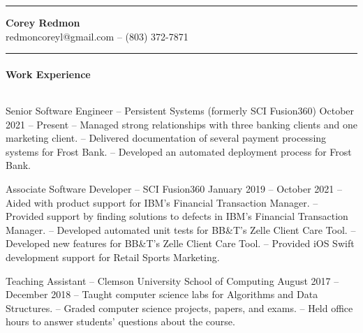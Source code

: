 \documentclass{article}
\begin{document}
  \hrule height 1pt
  \vspace{0.05in}
  \begin{center}
    {\Large \textbf{Corey Redmon}}\\
    redmoncoreyl@gmail.com -- (803) 372-7871
  \end{center}
  \vspace{0.1in}
  \hrule height 1pt

  \setlength{\parskip}{0.1in}
  \setlength{\parindent}{0.4in}

  \setlength{\parskip}{0.0in}
  \paragraph{Work Experience} $ $
  \setlength{\parskip}{0.1in}

  \hangindent=0.8in
  Senior Software Engineer -- Persistent Systems (formerly SCI Fusion360) \hfill October 2021 -- Present \newline
  -- Managed strong relationships with three banking clients and one marketing client. \newline
  -- Delivered documentation of several payment processing systems for Frost Bank. \newline
  -- Developed an automated deployment process for Frost Bank.

  \hangindent=0.8in
  Associate Software Developer -- SCI Fusion360 \hfill January 2019 -- October 2021 \newline
  -- Aided with product support for IBM's Financial Transaction Manager. \newline
  -- Provided support by finding solutions to defects in IBM's Financial Transaction Manager. \newline
  -- Developed automated unit tests for BB\&T's Zelle Client Care Tool. \newline
  -- Developed new features for BB\&T's Zelle Client Care Tool. \newline
  -- Provided iOS Swift development support for Retail Sports Marketing.

  \hangindent=0.8in
  Teaching Assistant -- Clemson University School of Computing \hfill August 2017 -- December 2018 \newline
  -- Taught computer science labs for Algorithms and Data Structures. \newline
  -- Graded computer science projects, papers, and exams. \newline
  -- Held office hours to answer students' questions about the course.
\end{document}
